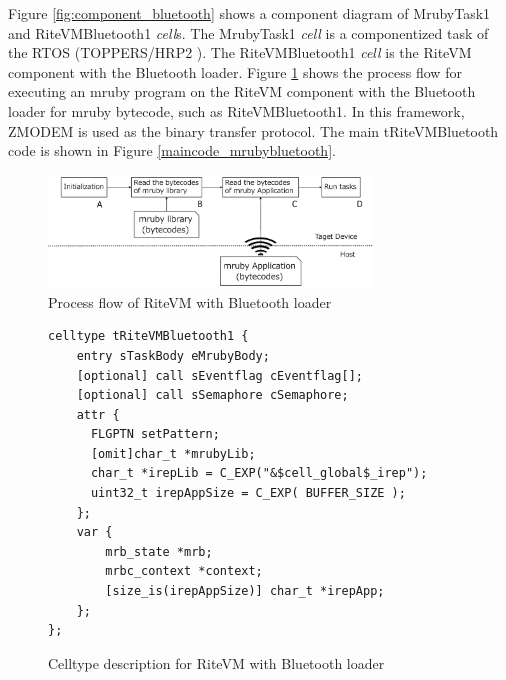 \documentclass[conference]{IEEEtran/IEEEtran/IEEEtran}
\begin{document}
Figure \ref{fig:component_bluetooth} shows a component diagram of MrubyTask1 and RiteVMBluetooth1 {\it cell}s.
The MrubyTask1 {\it cell} is a componentized task of the RTOS (TOPPERS/HRP2 \cite{par:hr-tecs}).
The RiteVMBluetooth1 {\it cell} is the RiteVM component with the Bluetooth loader.
Figure \ref{fig:control_flow} shows the process flow for executing an mruby program on the RiteVM component with the Bluetooth loader for mruby bytecode, such as RiteVMBluetooth1.
In this framework, ZMODEM \cite{par:zmodem} is used as the binary transfer protocol.
The main tRiteVMBluetooth code is shown in Figure \ref{maincode_mrubybluetooth}.

\begin{figure}[t]
    \centering
    \includegraphics[height=3.0cm,width=8.6cm,clip]{figure/control_flow.eps}
    \vspace{-3mm}
\caption{Process flow of RiteVM with Bluetooth loader}
    \vspace{-3mm}
\label{fig:control_flow}
\end{figure}

\begin{figure}[t]
\centering
\begin{lstlisting}
celltype tRiteVMBluetooth1 {
    entry sTaskBody eMrubyBody;
    [optional] call sEventflag cEventflag[];
    [optional] call sSemaphore cSemaphore;
    attr {
      FLGPTN setPattern;
      [omit]char_t *mrubyLib;
      char_t *irepLib = C_EXP("&$cell_global$_irep");
      uint32_t irepAppSize = C_EXP( BUFFER_SIZE );
    };
    var {
        mrb_state *mrb;
        mrbc_context *context;
        [size_is(irepAppSize)] char_t *irepApp;
    };
};
\end{lstlisting}
    \vspace{-3mm}
\caption{Celltype description for RiteVM with Bluetooth loader}
    \vspace{-3mm}
\label{celltype_mrubybluetooth}
\end{figure}
\end{document}
